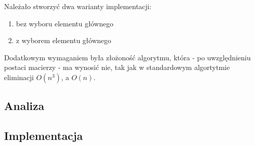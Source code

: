 Należało stworzyć dwa warianty implementacji:
\begin{enumerate}
  \item bez wyboru elementu głównego
  \item z wyborem elementu głównego
\end{enumerate}
Dodatkowym wymaganiem była złożoność algorytmu, która - po uwzględnieniu postaci macierzy - ma wynosić nie, tak jak w standardowym algortytmie eliminacji $O(n^3)$, a $O(n)$.
\subsection{Analiza}

\subsection{Implementacja}
